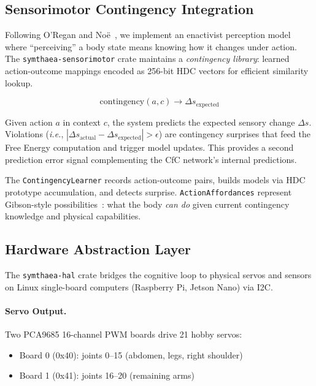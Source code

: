 \documentclass[11pt,twocolumn]{article}
\newcommand{\ie}{\textit{i.e.}}
\begin{document}
\subsection{Sensorimotor Contingency Integration}
\label{sec:sensorimotor}

Following O'Regan and No\"e~\cite{oregan2001sensorimotor}, we implement an enactivist perception model where ``perceiving'' a body state means knowing how it changes under action. The \texttt{symthaea-sensorimotor} crate maintains a \emph{contingency library}: learned action-outcome mappings encoded as 256-bit HDC vectors for efficient similarity lookup.

\begin{equation}
\text{contingency}(a, c) \to \Delta s_{\text{expected}}
\end{equation}

Given action $a$ in context $c$, the system predicts the expected sensory change $\Delta s$. Violations (\ie, $|\Delta s_{\text{actual}} - \Delta s_{\text{expected}}| > \epsilon$) are contingency surprises that feed the Free Energy computation and trigger model updates. This provides a second prediction error signal complementing the CfC network's internal predictions.

The \texttt{ContingencyLearner} records action-outcome pairs, builds models via HDC prototype accumulation, and detects surprise. \texttt{ActionAffordances} represent Gibson-style possibilities~\cite{gibson1979ecological}: what the body \emph{can do} given current contingency knowledge and physical capabilities.

\subsection{Hardware Abstraction Layer}
\label{sec:hal}

The \texttt{symthaea-hal} crate bridges the cognitive loop to physical servos and sensors on Linux single-board computers (Raspberry Pi, Jetson Nano) via I2C.

\paragraph{Servo Output.} Two PCA9685 16-channel PWM boards drive 21 hobby servos:
\begin{itemize}[nosep]
  \item Board 0 (0x40): joints 0--15 (abdomen, legs, right shoulder)
  \item Board 1 (0x41): joints 16--20 (remaining arms)
\end{itemize}
\end{document}
